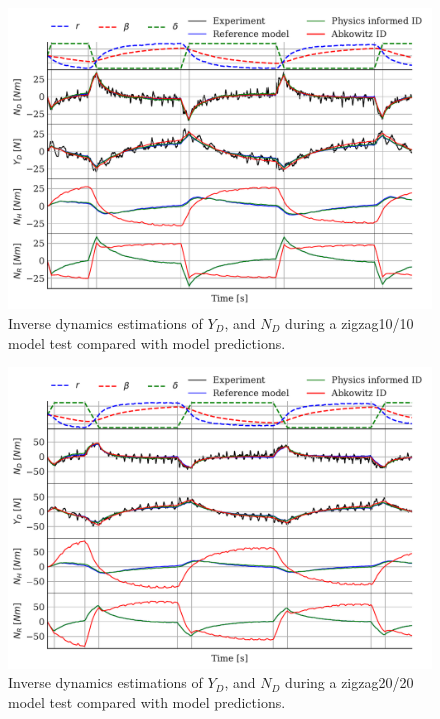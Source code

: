 \begin{figure}[h]
    \centering
    \includegraphics[width=\columnwidth]{figures/results.ID_zigzag10.pdf}
    \caption{Inverse dynamics estimations of $Y_D$, and $N_D$ during a zigzag10/10 model test compared with model predictions.}
    \label{fig:ID_regression_ID_N}
\end{figure}
\begin{figure}[h]
    \centering
    \includegraphics[width=\columnwidth]{figures/results.ID_zigzag20.pdf}
    \caption{Inverse dynamics estimations of $Y_D$, and $N_D$ during a zigzag20/20 model test compared with model predictions.}
    \label{fig:ID_regression_ID_N}
\end{figure}

